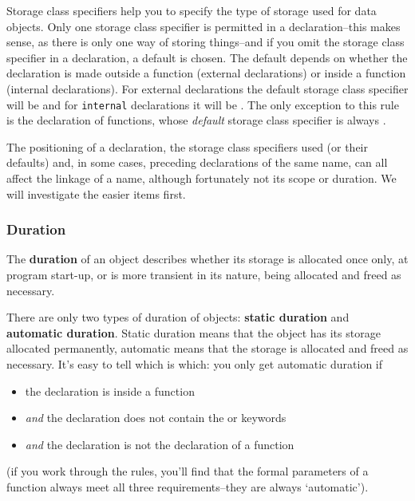    Storage class specifiers help you to specify the type of storage used
    for data objects. Only one storage class specifier is permitted in
    a declaration--this makes sense, as there is only one way of storing
    things--and if you omit the storage class specifier in
    a declaration, a default is chosen. The default depends on whether the
    declaration is made outside a function (external declarations) or inside
    a function (internal declarations). For external declarations the
    default storage class specifier will be \extern{} and for
    \texttt{internal} declarations it will be \auto. The
    only exception to this rule is the declaration of functions, whose
    \textit{default} storage class specifier is always
    \extern.


   The positioning of a declaration, the storage class specifiers used
    (or their defaults) and, in some cases, preceding declarations of the
    same name, can all affect the linkage of a name, although fortunately
    not its scope or duration. We will investigate the easier items
    first.


   \subsubsection{Duration}
    

    The \textbf{duration} of an object describes whether its storage is
     allocated once only, at program start-up, or is more transient in its
     nature, being allocated and freed as necessary.


    There are only two types of duration of objects: \textbf{static
     duration} and \textbf{automatic duration}. Static duration means
     that the object has its storage allocated permanently, automatic means
     that the storage is allocated and freed as necessary. It's easy to tell
     which is which: you only get automatic duration if


    \begin{itemize}
     \item the declaration is inside a function
     \item \textit{and} the declaration does not contain the
      \static{} or \extern{} keywords
     \item \textit{and} the declaration is not the declaration of a function
    \end{itemize}

    (if you work through the rules, you'll find that the formal
     parameters of a function always meet all three requirements--they
     are always `automatic').


